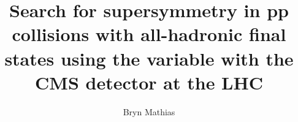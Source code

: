 \documentclass[hyper,AGBdraft,nobind,oneside,noroman]{hepthesis}%
\begin{document}
\linenumbers %
\title{Search for supersymmetry in pp collisions with all-hadronic final states using the \alt variable with the CMS detector at the LHC}
\author{Bryn Mathias}
   
\begin{frontmatter} 


\end{frontmatter}
  
\begin{mainmatter}





% 




\end{mainmatter}
    



\begin{backmatter}



\end{backmatter}
\begin{appendix}
  
  
  
  
  

\end{appendix}
\end{document}

